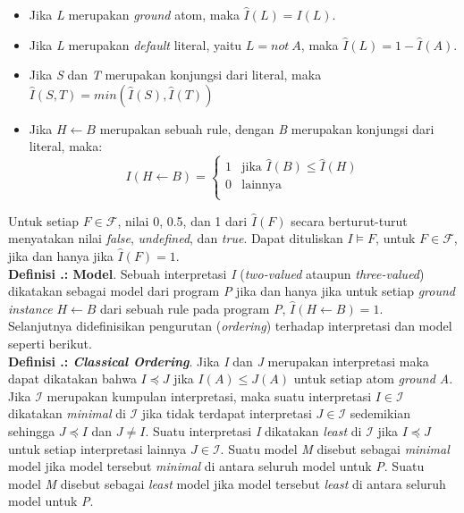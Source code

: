 \begin{itemize}
	\item Jika \textit{L} merupakan \textit{ground} atom, maka $\hat{I}(L) = I(L)$.
	\item Jika \textit{L} merupakan \textit{default} literal, yaitu $L = not \ A$, maka $\hat{I}(L) = 1 - \hat{I}(A)$.
	\item Jika \textit{S} dan \textit{T} merupakan konjungsi dari literal, maka $\hat{I}(S,T)=min(\hat{I}(S),\hat{I}(T))$
	\item Jika $H \leftarrow B$ merupakan sebuah rule, dengan \textit{B} merupakan konjungsi dari literal, maka:
	\begin{displaymath}
	I(H \leftarrow B) = 
	\begin{cases}
	1 & \text{jika $\hat{I}(B) \leq \hat{I}(H)$} \\
	0 & \text{lainnya} \\
	\end{cases}
	\end{displaymath}
\end{itemize}

\noindent Untuk setiap $F \in \mathcal{F}$, nilai 0, 0.5, dan 1 dari $\hat{I}(F)$ secara berturut-turut menyatakan nilai \textit{false}, \textit{undefined}, dan \textit{true}. Dapat dituliskan $I \models F$, untuk $F \in \mathcal{F}$, jika dan hanya jika $\hat{I}(F) = 1$.
\\

\noindent \textbf{Definisi \thebabDuaNum.\thedefBabDua: Model}. Sebuah interpretasi \textit{I} (\textit{two-valued} ataupun \textit{three-valued}) dikatakan sebagai model dari program \textit{P} jika dan hanya jika untuk setiap \textit{ground instance} $H \leftarrow B$ dari sebuah rule pada program \textit{P}, $\hat{I}(H \leftarrow B) = 1$.  
\\

Selanjutnya didefinisikan pengurutan (\textit{ordering}) terhadap interpretasi dan model seperti berikut.
\\

\noindent \textbf{Definisi \thebabDuaNum.\thedefBabDua: \textit{Classical Ordering}}. Jika \textit{I} dan \textit{J} merupakan interpretasi maka dapat dikatakan bahwa $I \preceq J$ jika $I(A) \leq J(A)$ untuk setiap atom \textit{ground A}. Jika $\mathcal{I}$ merupakan kumpulan interpretasi, maka suatu interpretasi $I \in \mathcal{I}$ dikatakan \textit{minimal} di $\mathcal{I}$ jika tidak terdapat interpretasi $J \in \mathcal{I}$ sedemikian sehingga $J \preceq I$ dan $J \neq I$. Suatu interpretasi \textit{I} dikatakan \textit{least} di $\mathcal{I}$ jika $I \preceq J$ untuk setiap interpretasi lainnya $J \in \mathcal{I}$. Suatu model \textit{M} disebut sebagai \textit{minimal} model jika model tersebut \textit{minimal} di antara seluruh model untuk \textit{P}. Suatu model \textit{M} disebut sebagai \textit{least} model jika model tersebut \textit{least} di antara seluruh model untuk \textit{P}.
\\

